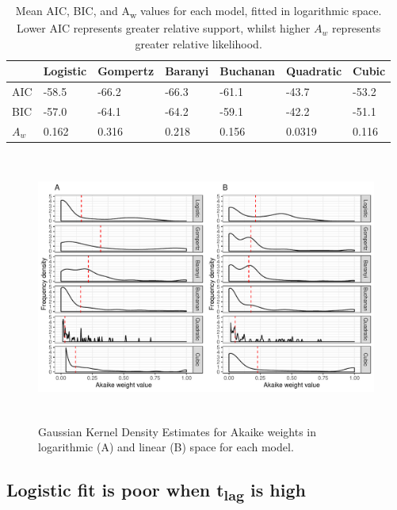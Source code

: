 \documentclass[11pt, a4paper]{article}
\begin{document}
\begin{linenumbers}
         \begin{table}[H]
\centering
\begin{tabular}{l|llllll}
       & Logistic & Gompertz & Baranyi & Buchanan & Quadratic & Cubic \\ \hline
AIC & -58.5    & -66.2    & -66.3   & -61.1    & -43.7     & -53.2 \\
BIC & -57.0    & -64.1    & -64.2   & -59.1    & -42.2     & -51.1 \\
$A_w$ & 0.162     & 0.316     & 0.218   & 0.156     & 0.0319     & 0.116
\end{tabular}
\caption{Mean AIC, BIC, and A\textsubscript{w}  values for each model, fitted in logarithmic space. Lower AIC represents greater relative support, whilst higher $A_w$ represents greater relative likelihood.}
\label{tab:meanAICBIC}
\end{table}




        \begin{figure}[H]
        \includegraphics[height=3.5in]{../results/Aw_distributions.pdf}
        \caption{Gaussian Kernel Density Estimates for Akaike weights in logarithmic (A) and linear (B) space for each model. }
        \label{fig:AWdist}
        \end{figure}
        
        

        
        \subsection{Logistic fit is poor when t\textsubscript{lag} is high}
                

\end{linenumbers}
\end{document}
